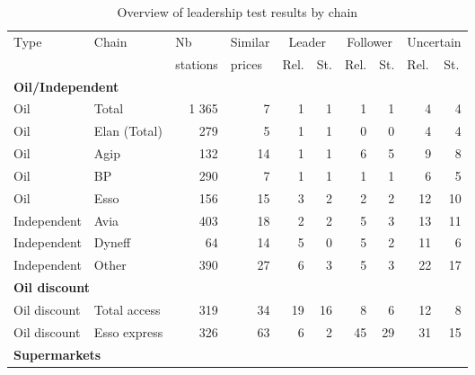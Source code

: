 \documentclass[english]{article}
\begin{document}
\begin{table}%
\caption{Overview of leadership test results by chain}
\label{tab:stats_leadership}
\begin{threeparttable}
    \begin{tabular}{llr|r|rr|rr|rr}
\toprule
\toprule
    Type   &  Chain     & \multicolumn{1}{l|}{Nb} & \multicolumn{1}{l|}{Similar} & \multicolumn{2}{c|}{Leader} & \multicolumn{2}{c|}{Follower} & \multicolumn{2}{c}{Uncertain} \\
           &            & \multicolumn{1}{l|}{stations} & \multicolumn{1}{l|}{prices} & \multicolumn{1}{l}{Rel.} & \multicolumn{1}{l|}{St.} & \multicolumn{1}{l}{Rel.} & \multicolumn{1}{l|}{St.} & \multicolumn{1}{l}{Rel.} & \multicolumn{1}{l}{St.} \\
    \midrule
    \multicolumn{2}{l}{\textbf{Oil/Independent}}  &       &       &       &       &       &       &       &  \\
    Oil   & Total & 1 365 & 7     & 1     & 1     & 1     & 1     & 4     & 4 \\
    Oil   & Elan (Total) & 279   & 5     & 1     & 1     & 0     & 0     & 4     & 4 \\
    Oil   & Agip  & 132   & 14    & 1     & 1     & 6     & 5     & 9     & 8 \\
    Oil  & BP    & 290   & 7     & 1     & 1     & 1     & 1     & 6     & 5 \\
    Oil  & Esso  & 156   & 15    & 3     & 2     & 2     & 2     & 12    & 10 \\
    Independent & Avia  & 403   & 18    & 2     & 2     & 5     & 3     & 13    & 11 \\
    Independent & Dyneff & 64    & 14    & 5     & 0     & 5     & 2     & 11    & 6 \\
    Independent & Other & 390   & 27    & 6     & 3     & 5     & 3     & 22    & 17 \\
    \midrule
    \multicolumn{2}{l}{\textbf{Oil discount}}       &       &       &       &       &       &       &       &  \\
    Oil discount & Total access & 319   & 34    & 19    & 16    & 8     & 6     & 12    & 8 \\
    Oil discount & Esso express & 326   & 63    & 6     & 2     & 45    & 29    & 31    & 15 \\
    \midrule
    \multicolumn{2}{l}{\textbf{Supermarkets}} &       &       &       &       &       &       &       &  \\

\end{tabular}
\end{threeparttable}
\end{table}
\end{document}
